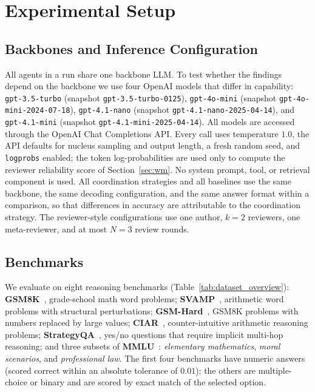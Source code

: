 \section{Experimental Setup}
\label{sec:setup}

\subsection{Backbones and Inference Configuration}
\label{sec:llm}

All agents in a run share one backbone LLM. To test whether the findings depend on the backbone we use four OpenAI models that differ in capability: \texttt{gpt-3.5-turbo} (snapshot \texttt{gpt-3.5-turbo-0125}), \texttt{gpt-4o-mini} (snapshot \texttt{gpt-4o-mini-2024-07-18}), \texttt{gpt-4.1-nano} (snapshot \texttt{gpt-4.1-nano-2025-04-14}), and \texttt{gpt-4.1-mini} (snapshot \texttt{gpt-4.1-mini-2025-04-14}).
All models are accessed through the OpenAI Chat Completions API.
Every call uses temperature \(1.0\), the API defaults for nucleus sampling and output length, a fresh random seed, and \texttt{logprobs} enabled; the token log-probabilities are used only to compute the reviewer reliability score of Section~\ref{sec:wm}.
No system prompt, tool, or retrieval component is used.
All coordination strategies and all baselines use the same backbone, the same decoding configuration, and the same answer format within a comparison, so that differences in accuracy are attributable to the coordination strategy.
The reviewer-style configurations use one author, \(k=2\) reviewers, one meta-reviewer, and at most \(N=3\) review rounds.

\subsection{Benchmarks}

We evaluate on eight reasoning benchmarks (Table~\ref{tab:dataset_overview}):
\textbf{GSM8K}~\cite{cobbe2021gsm8k}, grade-school math word problems;
\textbf{SVAMP}~\cite{patel2021svamp}, arithmetic word problems with structural perturbations;
\textbf{GSM-Hard}~\cite{gao2023pal}, GSM8K problems with numbers replaced by large values;
\textbf{CIAR}~\cite{liang2024mad}, counter-intuitive arithmetic reasoning problems;
\textbf{StrategyQA}~\cite{geva2021strategyqa}, yes/no questions that require implicit multi-hop reasoning;
and three subsets of \textbf{MMLU}~\cite{hendrycks2021mmlu}: \emph{elementary mathematics}, \emph{moral scenarios}, and \emph{professional law}.
The first four benchmarks have numeric answers (scored correct within an absolute tolerance of \(0.01\)); the others are multiple-choice or binary and are scored by exact match of the selected option.

